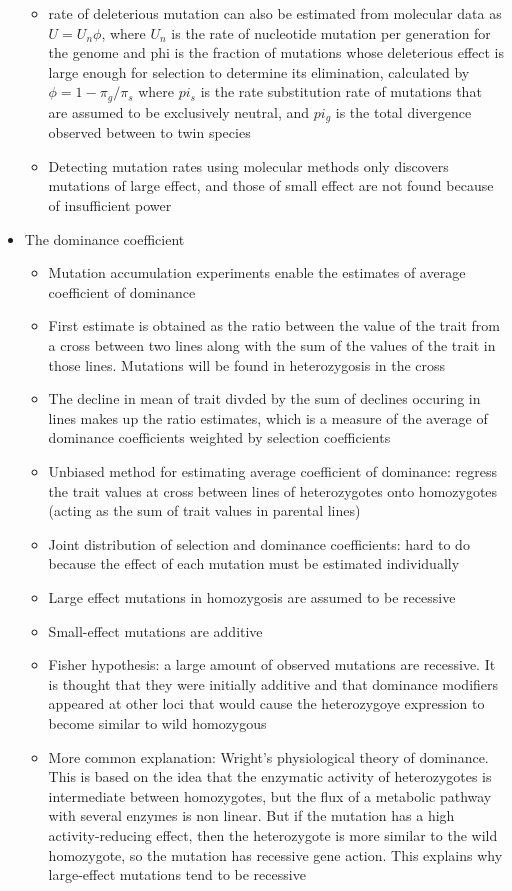 \documentclass[12pt]{amsart}
\begin{document}
\begin{itemize}
\begin{itemize}
\item rate of deleterious mutation can also be estimated from molecular data as $U = U_n\phi$, where $U_n$ is the rate of nucleotide mutation per generation for the genome and phi is the fraction of mutations whose deleterious effect is large enough for selection to determine its elimination, calculated by $\phi = 1 - \pi_g/\pi_s$ where $pi_s$ is the rate substitution rate of mutations that are assumed to be exclusively neutral, and $pi_g$ is the total divergence observed between to twin species 
\item Detecting mutation rates using molecular methods only discovers mutations of large effect, and those of small effect are not found because of insufficient power
\end{itemize}
\item The dominance coefficient
\begin{itemize}
\item Mutation accumulation experiments enable the estimates of average coefficient of dominance
\item First estimate is obtained as the ratio between the value of the trait from a cross between two lines along with the sum of the values of the trait in those lines. Mutations will be found in heterozygosis in the cross
\item The decline in mean of trait divded by the sum of declines occuring in lines makes up the ratio estimates, which is a measure of the average of dominance coefficients weighted by selection coefficients
\item Unbiased method for estimating average coefficient of dominance: regress the trait values at cross between lines of heterozygotes onto homozygotes (acting as the sum of trait values in parental lines)
\item Joint distribution of selection and dominance coefficients: hard to do because the effect of each mutation must be estimated individually 
\item Large effect mutations in homozygosis are assumed to be recessive
\item Small-effect mutations are additive 
\item Fisher hypothesis: a large amount of observed mutations are recessive. It is thought that they were initially additive and that dominance modifiers appeared at other loci that would cause the heterozygoye expression to become similar to wild homozygous 
\item More common explanation: Wright's physiological theory of dominance. This is based on the idea that the enzymatic activity of heterozygotes is intermediate between homozygotes, but the flux of a metabolic pathway with several enzymes is non linear. But if the mutation has a high activity-reducing effect, then the heterozygote is more similar to the wild homozygote, so the mutation has recessive gene action. This explains why large-effect mutations tend to be recessive

\end{itemize}
\end{itemize}
\end{document}
